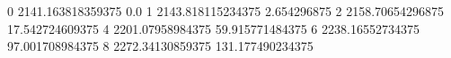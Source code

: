 0 2141.163818359375 0.0
1 2143.818115234375 2.654296875
2 2158.70654296875 17.542724609375
4 2201.07958984375 59.915771484375
6 2238.16552734375 97.001708984375
8 2272.34130859375 131.177490234375
